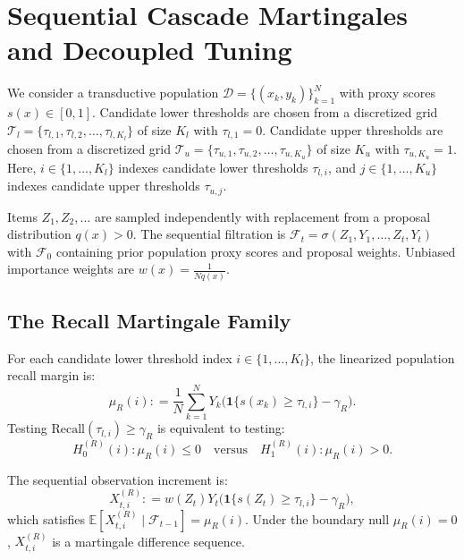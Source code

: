 \documentclass[11pt,a4paper]{article}
\newcommand{\coloneqq}{\mathrel{\mathop:}=}
\begin{document}
\newpage
\section{Sequential Cascade Martingales and Decoupled Tuning}

We consider a transductive population $\mathcal{D} = \{(x_k, y_k)\}_{k=1}^N$ with proxy scores $s(x) \in [0, 1]$. 
Candidate lower thresholds are chosen from a discretized grid $\mathcal{T}_l = \{\tau_{l, 1}, \tau_{l, 2}, \dots, \tau_{l, K_l}\}$ of size $K_l$ with $\tau_{l, 1} = 0$.
Candidate upper thresholds are chosen from a discretized grid $\mathcal{T}_u = \{\tau_{u, 1}, \tau_{u, 2}, \dots, \tau_{u, K_u}\}$ of size $K_u$ with $\tau_{u, K_u} = 1$.
Here, $i \in \{1, \dots, K_l\}$ indexes candidate lower thresholds $\tau_{l, i}$, and $j \in \{1, \dots, K_u\}$ indexes candidate upper thresholds $\tau_{u, j}$.

Items $Z_1, Z_2, \dots$ are sampled independently with replacement from a proposal distribution $q(x) > 0$. The sequential filtration is $\mathcal{F}_t = \sigma(Z_1, Y_1, \dots, Z_t, Y_t)$ with $\mathcal{F}_0$ containing prior population proxy scores and proposal weights. Unbiased importance weights are $w(x) = \frac{1}{N q(x)}$.

\subsection{The Recall Martingale Family}
For each candidate lower threshold index $i \in \{1, \dots, K_l\}$, the linearized population recall margin is:
\begin{equation}\label{eq:recall_margin}
\mu_R(i) \coloneqq \frac{1}{N}\sum_{k=1}^N Y_k \big(\mathbf{1}\{s(x_k) \ge \tau_{l, i}\} - \gamma_R\big).
\end{equation}
Testing $\text{Recall}(\tau_{l, i}) \ge \gamma_R$ is equivalent to testing:
\begin{equation}\label{eq:h0_recall}
H_0^{(R)}(i) : \mu_R(i) \le 0 \quad \text{versus} \quad H_1^{(R)}(i) : \mu_R(i) > 0.
\end{equation}

The sequential observation increment is:
\begin{equation}\label{eq:obs_recall}
X_{t, i}^{(R)} \coloneqq w(Z_t) Y_t \big(\mathbf{1}\{s(Z_t) \ge \tau_{l, i}\} - \gamma_R\big),
\end{equation}
which satisfies $\mathbb{E}[X_{t, i}^{(R)} \mid \mathcal{F}_{t-1}] = \mu_R(i)$. Under the boundary null $\mu_R(i) = 0$, $X_{t, i}^{(R)}$ is a martingale difference sequence.
\end{document}
